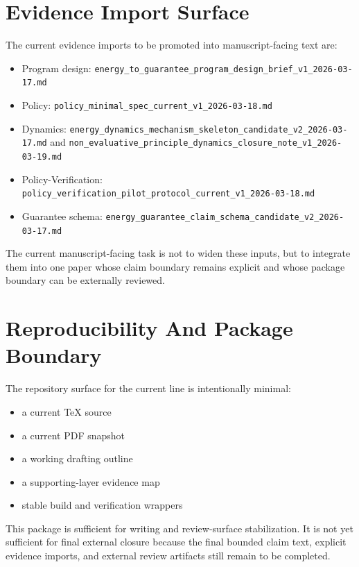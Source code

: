 \documentclass[11pt]{article}
\begin{document}
\section{Evidence Import Surface}

The current evidence imports to be promoted into manuscript-facing text are:

\begin{itemize}
\item Program design:
  \texttt{energy\_to\_guarantee\_program\_design\_brief\_v1\_2026-03-17.md}
\item Policy:
  \texttt{policy\_minimal\_spec\_current\_v1\_2026-03-18.md}
\item Dynamics:
  \texttt{energy\_dynamics\_mechanism\_skeleton\_candidate\_v2\_2026-03-17.md}
  and
  \texttt{non\_evaluative\_principle\_dynamics\_closure\_note\_v1\_2026-03-19.md}
\item Policy-Verification:
  \texttt{policy\_verification\_pilot\_protocol\_current\_v1\_2026-03-18.md}
\item Guarantee schema:
  \texttt{energy\_guarantee\_claim\_schema\_candidate\_v2\_2026-03-17.md}
\end{itemize}

The current manuscript-facing task is not to widen these inputs, but to integrate
them into one paper whose claim boundary remains explicit and whose package
boundary can be externally reviewed.

\section{Reproducibility And Package Boundary}

The repository surface for the current line is intentionally minimal:
\begin{itemize}
\item a current TeX source
\item a current PDF snapshot
\item a working drafting outline
\item a supporting-layer evidence map
\item stable build and verification wrappers
\end{itemize}

This package is sufficient for writing and review-surface stabilization. It is not
yet sufficient for final external closure because the final bounded claim text,
explicit evidence imports, and external review artifacts still remain to be
completed.
\end{document}
